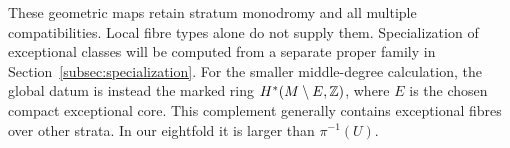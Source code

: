 These geometric maps retain stratum monodromy and all multiple
compatibilities. Local fibre types alone do not supply them.
Specialization of exceptional classes will be computed from a
separate proper family in Section~\ref{subsec:specialization}.
For the smaller middle-degree calculation, the global datum is
instead the marked ring \(H^*(M\setminus E,\mathbb Z)\), where \(E\) is the
chosen compact exceptional core. This complement generally contains
exceptional fibres over other strata. In our eightfold it is larger
than \(\pi^{-1}(U)\).
